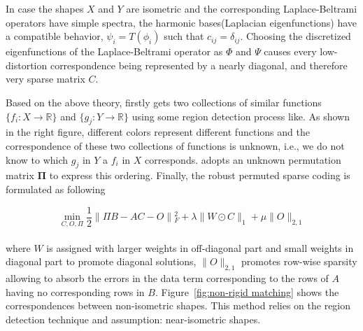 In case the shapes $X$ and $Y$ are isometric and the corresponding Laplace-Beltrami operators have simple spectra,
the harmonic bases(Laplacian eigenfunctions) have a compatible behavior, $\psi_{i}=T(\phi_{i})$ such that $c_{ij}=\delta_{ij}$.
Choosing the discretized eigenfunctions of the Laplace-Beltrami operator as $\Phi$ and $\Psi$ causes every low-distortion correspondence being represented by a nearly diagonal, and therefore very sparse matrix $C$.

Based on the above theory, \cite{pokrass2013sparse} firstly gets two collections of similar functions $\{f_{i}:X\to \mathbb{R}\}$ and $\{g_{j}:Y\to \mathbb{R}\}$ using some region detection process like\cite{litman2011diffusion}. As shown in the right figure, different colors represent different functions and the correspondence of these two collections of functions is unknown, i.e., we do not know to which $g_{j}$ in $Y$ a $f_{i}$ in $X$ corresponds.
\cite{pokrass2013sparse} adopts an unknown permutation matrix $\mathbf{\Pi}$ to express this ordering. Finally, the robust permuted sparse coding is formulated as following

\small{
\begin{equation}
 \label{eq:non-rigid shape matching}
 \min_{C,O,\Pi}\frac{1}{2} \|\Pi B - AC - O \|{_{F}^2} + \lambda\| W \odot C\|_1+\mu\|O\|_{2,1}
\end{equation}
}
\\
where $W$ is assigned with larger weights in off-diagonal part and small weights in diagonal part to promote diagonal solutions, $\|O\|_{2,1}$ promotes row-wise sparsity allowing to absorb the errors in the data term corresponding to the rows of $A$ having no corresponding rows in $B$.
Figure~\ref{fig:non-rigid matching} shows the correspondences between non-isometric shapes. This method relies on the region detection technique and assumption: near-isometric shapes.

